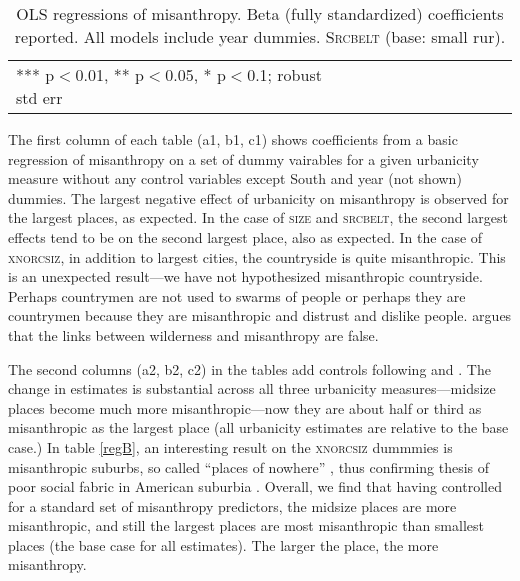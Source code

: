 \documentclass[11pt, letterpaper]{article}
\begin{document}
\begin{spacing}{1.4}
\begin{table}[h!]\centering
\caption{OLS regressions  of misanthropy. Beta (fully standardized) coefficients
  reported. All models include year dummies. \textsc{Srcbelt} (base: small rur).} \label{regC}
\begin{scriptsize} \begin{tabular}{p{1.8in}p{.45in}p{.45in}p{.45in}p{.45in}p{.45in}p{.45in}p{.45in}p{.45in}p{.45in}p{.45 in}}\hline

\hline  *** p$<$0.01, ** p$<$0.05, * p$<$0.1; robust std err
\end{tabular}\end{scriptsize}\end{table}


The first column of each table (a1, b1, c1) shows coefficients from a basic
regression of misanthropy on a set of dummy vairables for a given urbanicity
measure without any control variables except South and year (not shown)
dummies. 
 The largest negative effect of
urbanicity on misanthropy is observed for the largest
places, as expected. In the case of \textsc{size} and \textsc{srcbelt}, the second largest effects
tend to be on the second largest place, also as expected.  In
the case of \textsc{xnorcsiz}, in addition to largest cities,  the countryside  is quite
misanthropic. This is an unexpected result---we have not hypothesized
misanthropic countryside. Perhaps countrymen are not used to swarms of people or
perhaps they are countrymen because they are misanthropic and distrust and
dislike people.  \citet{keeling13} argues that the links between wilderness and misanthropy are false.

The second columns (a2, b2, c2) in the tables add controls following
\citet{welch07} and \citet{smith97}.
 The change in  estimates is substantial across all three urbanicity
 measures---midsize places become much more misanthropic---now they are about
 half or third as misanthropic as the largest place (all urbanicity estimates
 are relative to the base case.) 
 In table \ref{regB}, an interesting result on the
\textsc{xnorcsiz} dummmies is misanthropic suburbs, so called ``places of
nowhere'' \citep{kunstler12}, thus confirming thesis of
 poor social fabric in American suburbia \citep{duany01,kunstler12,kay97}.
Overall,
 we find that having controlled for a standard set of misanthropy predictors, the midsize places are more misanthropic, and still the
 largest places are most misanthropic than smallest
 places (the base case for all estimates).
The larger the place, the more misanthropy. 


\end{spacing}
\end{document}
